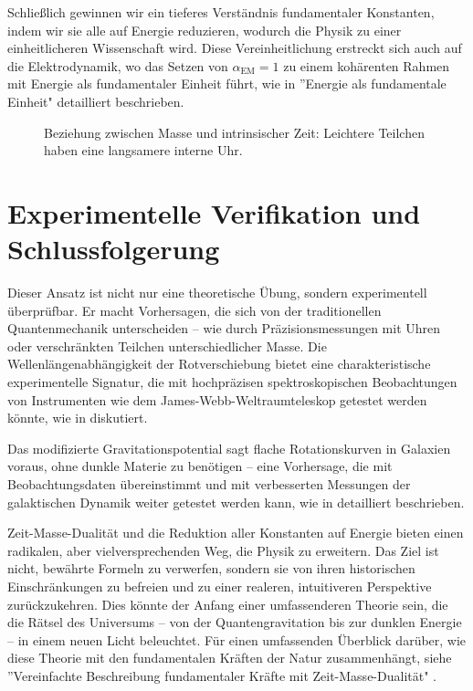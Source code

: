 \documentclass[a4paper,12pt]{article}
\newcommand{\Tfield}{T(x)}
\newcommand{\alphaEM}{\alpha_{\text{EM}}}
\begin{document}
	Schließlich gewinnen wir ein tieferes Verständnis fundamentaler Konstanten, indem wir sie alle auf Energie reduzieren, wodurch die Physik zu einer einheitlicheren Wissenschaft wird. Diese Vereinheitlichung erstreckt sich auch auf die Elektrodynamik, wo das Setzen von \(\alphaEM = 1\) zu einem kohärenten Rahmen mit Energie als fundamentaler Einheit führt, wie in ''Energie als fundamentale Einheit" \cite{pascher_alpha_2025} detailliert beschrieben.
	
	\begin{figure}[h]
		\centering
		\caption{Beziehung zwischen Masse und intrinsischer Zeit: Leichtere Teilchen haben eine langsamere interne Uhr.}
	\end{figure}
	
	\section{Experimentelle Verifikation und Schlussfolgerung}
	
	Dieser Ansatz ist nicht nur eine theoretische Übung, sondern experimentell überprüfbar. Er macht Vorhersagen, die sich von der traditionellen Quantenmechanik unterscheiden – wie durch Präzisionsmessungen mit Uhren oder verschränkten Teilchen unterschiedlicher Masse. Die Wellenlängenabhängigkeit der Rotverschiebung bietet eine charakteristische experimentelle Signatur, die mit hochpräzisen spektroskopischen Beobachtungen von Instrumenten wie dem James-Webb-Weltraumteleskop getestet werden könnte, wie in \cite{pascher_messdifferenzen_2025} diskutiert.
	
	Das modifizierte Gravitationspotential sagt flache Rotationskurven in Galaxien voraus, ohne dunkle Materie zu benötigen – eine Vorhersage, die mit Beobachtungsdaten übereinstimmt und mit verbesserten Messungen der galaktischen Dynamik weiter getestet werden kann, wie in \cite{pascher_galaxies_2025} detailliert beschrieben.
	
	Zeit-Masse-Dualität und die Reduktion aller Konstanten auf Energie bieten einen radikalen, aber vielversprechenden Weg, die Physik zu erweitern. Das Ziel ist nicht, bewährte Formeln zu verwerfen, sondern sie von ihren historischen Einschränkungen zu befreien und zu einer realeren, intuitiveren Perspektive zurückzukehren. Dies könnte der Anfang einer umfassenderen Theorie sein, die die Rätsel des Universums – von der Quantengravitation bis zur dunklen Energie – in einem neuen Licht beleuchtet. Für einen umfassenden Überblick darüber, wie diese Theorie mit den fundamentalen Kräften der Natur zusammenhängt, siehe ''Vereinfachte Beschreibung fundamentaler Kräfte mit Zeit-Masse-Dualität" \cite{pascher_grundkraefte_2025}.
	
\end{document}
